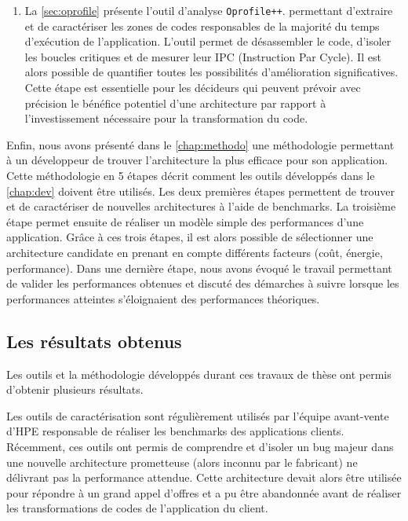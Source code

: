 \begin{enumerate}
        \item La \autoref{sec:oprofile} présente  l'outil d'analyse \verb|Oprofile++|.
        permettant d'extraire et de caractériser les zones de codes responsables de la majorité du temps d'exécution de l'application. L'outil permet de désassembler le code, d'isoler les boucles critiques et de mesurer leur IPC (Instruction Par Cycle). Il est alors possible de quantifier toutes les possibilités d'amélioration significatives. Cette étape est essentielle pour les décideurs qui peuvent prévoir avec précision le bénéfice potentiel d'une architecture par rapport à l'investissement nécessaire pour la transformation du code.
    
    \end{enumerate}
    Enfin, nous avons présenté dans le \autoref{chap:methodo} une méthodologie permettant à un développeur de trouver l'architecture la plus efficace pour son application. Cette méthodologie en 5 étapes décrit comment les outils développés dans le \autoref{chap:dev} doivent être utilisés. Les deux premières étapes permettent de trouver et de caractériser de nouvelles architectures à l'aide de benchmarks. La troisième étape permet ensuite de réaliser un modèle simple des performances d'une application. Grâce à ces trois étapes, il est alors possible de sélectionner une architecture candidate en prenant en compte différents facteurs (coût, énergie, performance). Dans une dernière étape, nous avons évoqué le travail permettant de valider les performances obtenues et discuté des démarches à suivre lorsque les performances atteintes s'éloignaient des performances théoriques.
               
 
 
    \subsection{Les résultats obtenus}
   
        Les outils et la méthodologie développés durant ces travaux de thèse ont permis d'obtenir plusieurs résultats.
        
        Les outils de caractérisation sont régulièrement utilisés par l'équipe avant-vente d'HPE responsable de réaliser les benchmarks des applications clients. Récemment, ces outils ont permis de comprendre et d’isoler un bug majeur dans une nouvelle architecture prometteuse (alors inconnu par le fabricant) ne délivrant pas la performance attendue. Cette architecture devait alors être utilisée pour répondre à un grand appel d'offres et a pu être abandonnée avant de réaliser les transformations de codes de l'application du client.
        
